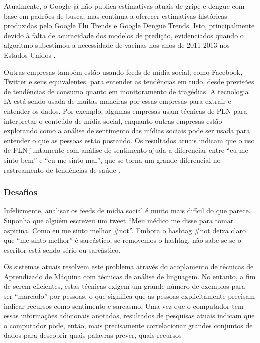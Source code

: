 \documentclass[
	12pt,				%
	openright,			%
	oneside,			%
	a4paper,			%
	english,			%
	spanish,			%
	brazil				%
	]{abntex2}
\begin{document}
Atualmente, o Google já não publica estimativas atuais de gripe e dengue com base em padrões de busca, mas continua a oferecer estimativas históricas produzidas pelo Google Flu Trends e Google Dengue Trends. Isto, principalmente devido à falta de acuracidade dos modelos de predição, evidenciados quando o algoritmo subestimou a necessidade de vacinas nos anos de 2011-2013 nos Estados Unidos  \cite{article_google_flu}.

Outras empresas também estão usando feeds de mídia social, como Facebook, Twitter e seus equivalentes, para entender as tendências em tudo, desde previsões de tendências de consumo quanto em monitoramento de tragédias. A tecnologia IA está sendo usada de muitas maneiras por essas empresas para extrair e entender os dados. Por exemplo, algumas empresas usam técnicas de PLN para interpretar o conteúdo de mídia social, enquanto outras empresas estão explorando como a análise de sentimento das mídias sociais pode ser usada para entender o que as pessoas estão postando. Os resultados atuais indicam que o uso de PLN juntamente com análise de sentimento ajuda a diferenciar entre ``eu me sinto bem'' e ``eu me sinto mal'', que se torna um grande diferencial no rastreamento de tendências de saúde \cite{book_social_machines}.
	
	\subsubsection*{Desafios}
Infelizmente, analisar os feeds de mídia social é muito mais difícil do que parece. Suponha que alguém escreveu um tweet ``Meu médico me disse para tomar aspirina. Como eu me sinto melhor \#not''. Embora o hashtag \#not deixa claro que ``me sinto melhor'' é sarcástico, se removemos o hashtag, não sabe-se se o escritor está sendo sério ou sarcástico.

Os sistemas atuais resolvem este problema através do acoplamento de técnicas de Aprendizado de Máquina com técnicas de análise de linguagem. No entanto, a fim de serem eficientes, estas técnicas exigem um grande número de exemplos para ser ``marcado'' por pessoas, o que significa que as pessoas explicitamente precisam indicar recursos como sentimento e sarcasmo. Uma vez que o computador tem essas informações adicionais anotadas, resultados de pesquisas atuais indicam que o computador pode, então, mais precisamente correlacionar grandes conjuntos de dados para descobrir quais palavras prever, quais recursos %
\end{document}
